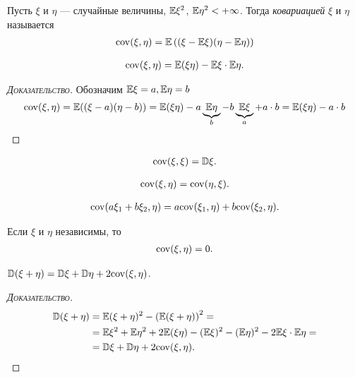 \documentclass[../main.tex]{subfiles}
\begin{document}
   \begin{df}[ковариация]
    Пусть $ \xi $ и $ \eta $ --- случайные величины, $ \mathbb E\xi^{2} $, $ \mathbb E\eta^{2} < +\infty$. Тогда \textit{ковариацией} $ \xi $ и $ \eta $ называется
    \begin{align*}
     \mathrm{cov}(\xi,\eta) = \mathbb E \left( (\xi - \mathbb E\xi)(\eta - \mathbb E\eta) \right)
    \end{align*} 
   \end{df}
   \begin{prop}
    \begin{align*}
     \mathrm{cov}(\xi,\eta) = \mathbb E(\xi\eta) - \mathbb E\xi \cdot \mathbb E\eta.
    \end{align*} 
   \end{prop}
   \begin{proof}[\normalfont\textsc{Доказательство}]
    Обозначим $\mathbb E \xi = a, \mathbb E \eta = b$ 
    \begin{align*}
     \mathrm{cov}(\xi, \eta) = \mathbb E((\xi - a)(\eta - b)) = \mathbb E(\xi \eta) - a\underbrace{\mathbb E\eta}_b -b\underbrace{\mathbb E\xi}_a + a \cdot b = \mathbb E(\xi \eta) - a \cdot b
    \end{align*}
   \end{proof}
   \begin{prop}
    \begin{align*}
     \mathrm{cov}(\xi,\xi) = \mathbb D\xi.
    \end{align*} 
   \end{prop}
   \begin{prop}
    \begin{align*}
     \mathrm{cov}(\xi,\eta) = \mathrm{cov}(\eta,\xi).
    \end{align*}
   \end{prop}
   \begin{prop}
    \begin{align*}
     \mathrm{cov}(a\xi_1 + b\xi_2, \eta) = a\mathrm{cov}(\xi_1,\eta) + b \mathrm{cov}(\xi_2, \eta).
    \end{align*} 
   \end{prop}
   \begin{prop}
    Если $ \xi $ и $ \eta $ независимы, то
    \begin{align*}
     \mathrm{cov}(\xi,\eta) = 0.
    \end{align*} 
   \end{prop}
   \begin{prop}
    $ \mathbb D(\xi + \eta) = \mathbb D\xi + \mathbb D\eta + 2\mathrm{cov}(\xi,\eta) $.
   \end{prop}
   \begin{proof}[\normalfont\textsc{Доказательство}]
    \begin{align*}
     \mathbb D(\xi+\eta) &= \mathbb E(\xi+\eta)^{2} - \left( \mathbb E(\xi+\eta) \right)^{2} = \\
     &= \mathbb E\xi^{2} + \mathbb E\eta^{2} + 2\mathbb E(\xi\eta) - (\mathbb E\xi)^{2} - (\mathbb E\eta)^{2} - 2\mathbb E\xi \cdot \mathbb E\eta = \\
     &= \mathbb D\xi + \mathbb D\eta +2\mathrm{cov}(\xi,\eta).
    \end{align*} 
   \end{proof}
\end{document}
